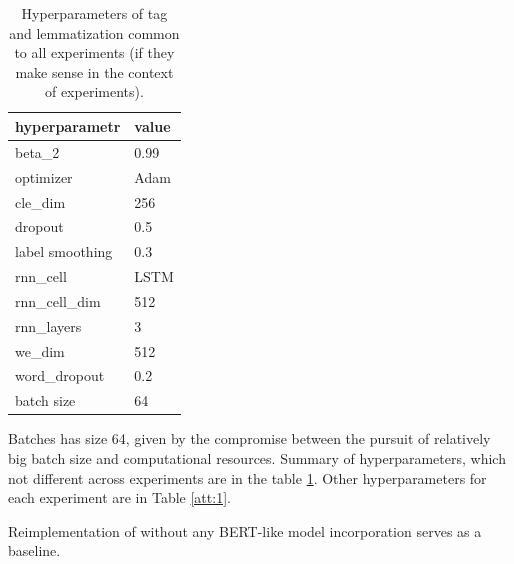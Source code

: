  \begin{table}[!h]
 \centering
\begin{tabular}{|l||l|}
\hline
hyperparametr   & \multicolumn{1}{l|}{value} \\ \hline \hline
beta\_2          & 0.99                       \\ \hline
optimizer       & Adam                       \\ \hline
cle\_dim         & 256                        \\ \hline
dropout         & 0.5                        \\ \hline
label smoothing & 0.3                        \\ \hline
rnn\_cell        & LSTM                       \\ \hline
rnn\_cell\_dim    & 512                        \\ \hline
rnn\_layers      & 3                          \\ \hline
we\_dim          & 512                        \\ \hline
word\_dropout    & 0.2                        \\ \hline
batch size & 64 \\ \hline
\end{tabular}
\caption{Hyperparameters of tag and lemmatization common to all experiments (if they make sense in the context of experiments).}
\label{tab:hyp_all}
\end{table}
Batches has size 64, given by the compromise between the pursuit of relatively big batch size and computational resources. Summary of hyperparameters, which not different across experiments are in the table \ref{tab:hyp_all}. Other hyperparameters for each experiment are in Table \ref{att:1}.
\par 
Reimplementation of \citep{Straka2019c} without any BERT-like model incorporation serves as a baseline.

